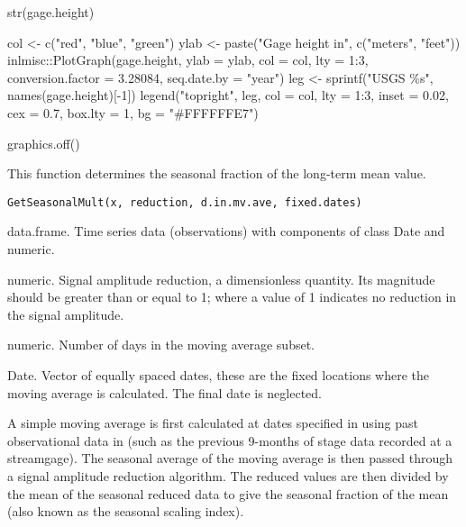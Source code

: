 \documentclass[a4paper]{book}
\begin{document}
%
\begin{Examples}
\begin{ExampleCode}
str(gage.height)

col <- c("red", "blue", "green")
ylab <- paste("Gage height in", c("meters", "feet"))
inlmisc::PlotGraph(gage.height, ylab = ylab, col = col, lty = 1:3,
                   conversion.factor = 3.28084, seq.date.by = "year")
leg <- sprintf("USGS \%s", names(gage.height)[-1])
legend("topright", leg, col = col, lty = 1:3, inset = 0.02, cex = 0.7,
       box.lty = 1, bg = "#FFFFFFE7")

graphics.off()

\end{ExampleCode}
\end{Examples}
%
\begin{Description}\relax
This function determines the seasonal fraction of the long-term mean value.
\end{Description}
%
\begin{Usage}
\begin{verbatim}
GetSeasonalMult(x, reduction, d.in.mv.ave, fixed.dates)
\end{verbatim}
\end{Usage}
%
\begin{Arguments}
\begin{ldescription}
\item[\code{x}] data.frame.
Time series data (observations) with components of class Date and numeric.

\item[\code{reduction}] numeric.
Signal amplitude reduction, a dimensionless quantity.
Its magnitude should be greater than or equal to 1;
where a value of 1 indicates no reduction in the signal amplitude.

\item[\code{d.in.mv.ave}] numeric.
Number of days in the moving average subset.

\item[\code{fixed.dates}] Date.
Vector of equally spaced dates, these are the fixed locations where the moving average is calculated.
The final date is neglected.
\end{ldescription}
\end{Arguments}
%
\begin{Details}\relax
A simple moving average is first calculated at dates specified in 
using past observational data in 
(such as the previous 9-months of stage data recorded at a streamgage).
The seasonal average of the moving average is then passed through a signal amplitude reduction algorithm.
The reduced values are then divided by the mean of the seasonal reduced data to give
the seasonal fraction of the mean (also known as the seasonal scaling index).
\end{Details}
\end{document}
